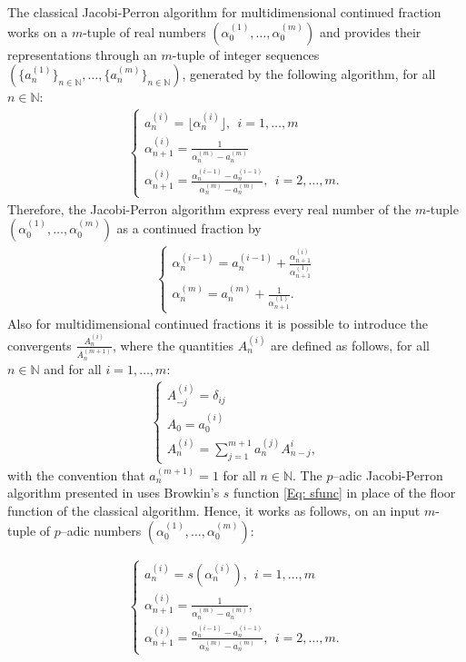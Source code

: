 \documentclass[12pt, reqno]{amsart}
\theoremstyle{plain}
\theoremstyle{definition}
\begin{document}
The classical Jacobi-Perron algorithm for multidimensional continued fraction works on a $m$-tuple of real numbers $(\alpha_0^{(1)},\ldots,\alpha_0^{(m)})$ and provides their representations through an $m$-tuple of integer sequences $(\{a_n^{(1)}\}_{n\in\mathbb{N}},\ldots,\{a_n^{(m)}\}_{n\in\mathbb{N}})$, generated by the following algorithm, for all $n\in\mathbb{N}$:
\begin{align*}
\begin{cases}
a_n^{(i)}=\lfloor \alpha_n^{(i)} \rfloor, \ \ i=1,\ldots,m\\
\alpha_{n+1}^{(i)}=\frac{1}{\alpha_n^{(m)}-a_n^{(m)}}\\
\alpha_{n+1}^{(i)}=\frac{\alpha_n^{(i-1)}-a_n^{(i-1)}}{\alpha_n^{(m)}-a_n^{(m)}}, \ \ i=2,\ldots,m.
\end{cases}
\end{align*}
Therefore, the Jacobi-Perron algorithm express every real number of the $m$-tuple $(\alpha_0^{(1)},\ldots,\alpha_0^{(m)})$ as a continued fraction by
\begin{align*} 
\begin{cases}
\alpha_{n}^{(i-1)}=a_{n}^{(i-1)}+\frac{\alpha_{n+1}^{(i)}}{\alpha_{n+1}^{(1)}}\\
\alpha_{n}^{(m)}=a_{n}^{(m)}+\frac{1}{\alpha_{n+1}^{(1)}}.
\end{cases}
\end{align*}
Also for multidimensional continued fractions it is possible to introduce the  convergents $\frac{A_n^{(i)}}{A_n^{(m+1)}}$, where the quantities $A_n^{(i)}$ are defined as follows, for all $n\in\mathbb{N}$ and for all $i=1,\ldots,m$:
\begin{align*}
\begin{cases}
A_{-j}^{(i)}=\delta_{ij}\\
A_0=a_0^{(i)}\\
A_n^{(i)}=\sum\limits_{j=1}^{m+1}a_n^{(j)}A_{n-j}^{i},
\end{cases}
\end{align*}
with the convention that $a_n^{(m+1)}=1$ for all $n\in\mathbb{N}$. The $p$--adic Jacobi-Perron algorithm presented in \cite{MT1} uses Browkin's $s$ function \eqref{Eq: sfunc} in place of the floor function of the classical algorithm. Hence, it works as follows, on an input $m$-tuple of $p$--adic numbers $(\alpha_0^{(1)},\ldots,\alpha_0^{(m)})$:

\begin{align}\label{Alg: padicJP}
\begin{cases}
a_n^{(i)}=s(\alpha_n^{(i)}), \ \ i=1,\ldots,m\\
\alpha_{n+1}^{(i)}=\frac{1}{\alpha_n^{(m)}-a_n^{(m)}},\\
\alpha_{n+1}^{(i)}=\frac{\alpha_n^{(i-1)}-a_n^{(i-1)}}{\alpha_n^{(m)}-a_n^{(m)}}, \ \ i=2,\ldots,m.
\end{cases}
\end{align}
\end{document}
